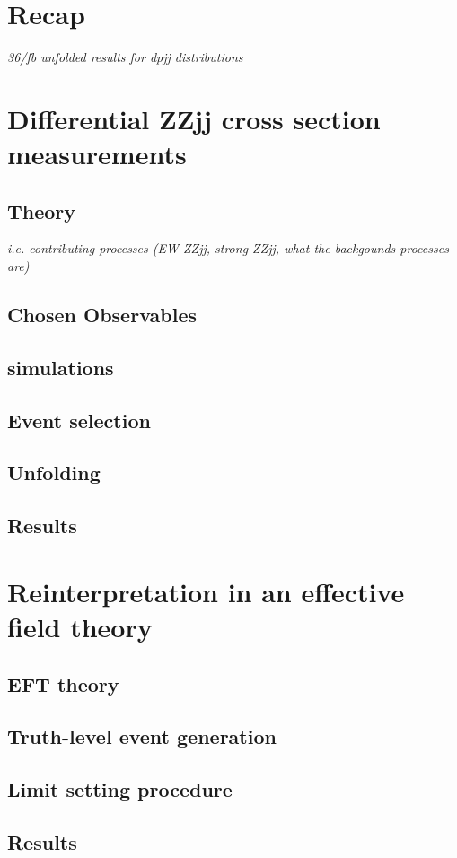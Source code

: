 \documentclass[a4paper,12pt]{article}
\begin{document}
	\section{Recap}
	\label{sec:recap}
		\emph{36/fb unfolded results for dpjj distributions}
	\section{Differential ZZjj cross section measurements}
	\label{sec:xsmea}
		\subsection{Theory}
		\label{ss:theory}
			\emph{i.e. contributing processes (EW ZZjj, strong ZZjj, what the backgounds processes are)}
		\subsection{Chosen Observables}
		\subsection{simulations}
		\subsection{Event selection}
		\subsection{Unfolding}
		\subsection{Results}
	\section{Reinterpretation in an effective field theory}
		\subsection{EFT theory}
		\subsection{Truth-level event generation}
		\subsection{Limit setting procedure}
		\subsection{Results}
	
\end{document}
